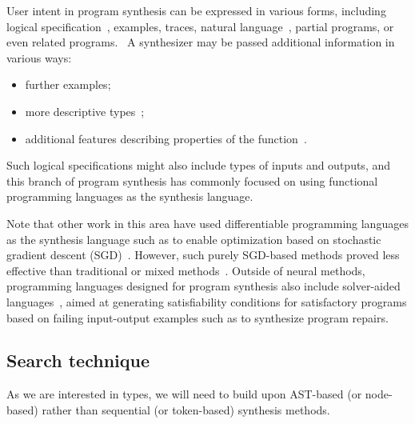 \documentclass{article}
\begin{document}


User intent in program synthesis can be expressed in various forms, including logical specification~\citep{temporalstreamlogic},
examples, traces, natural language~\citep{abstractsyntaxnetworks}, partial programs, or even related programs.~\citep{gulwani2017program}
A synthesizer may be passed additional information in various ways:
\begin{itemize}
    \item further examples;
    \item more descriptive types~\citep{synquid};
    \item additional features describing properties of the function~\citep{odena2020learning}.
\end{itemize}

Such logical specifications might also include types of inputs and outputs,
and this branch of program synthesis has commonly focused on using functional programming languages as the synthesis language.%
~\citep{synquid,eguchi2018automated,scythe,scout,gissurarson2018suggesting,idris,lenses}

Note that other work in this area have used differentiable programming languages
as the synthesis language such as to enable optimization based on
stochastic gradient descent (SGD)~\citep{forth,terpret}.
However, such purely SGD-based methods proved less effective than traditional or mixed methods~\citep{terpret}.
Outside of neural methods, programming languages designed for program synthesis also include solver-aided languages~\citep{rosette},
aimed at generating satisfiability conditions for satisfactory programs based on failing input-output examples such as to synthesize program repairs.

\subsection{Search technique}

As we are interested in types, we will need to build upon AST-based (or node-based) rather than sequential (or token-based) synthesis methods.
\end{document}
